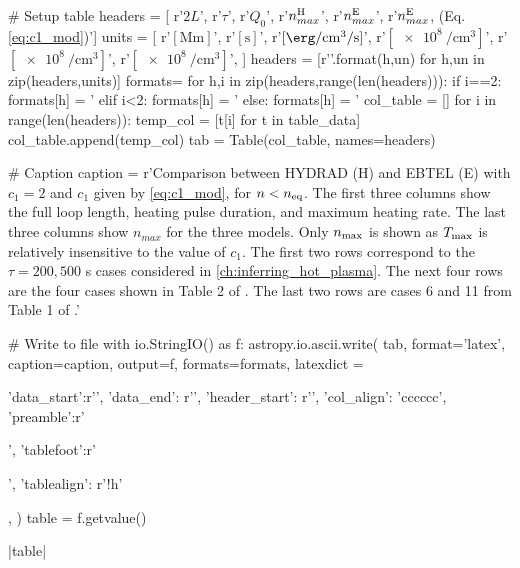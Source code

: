 \begin{pycode}[chapter2]
# Setup table
headers = [
    r'$2L$',
    r'$\tau$',
    r'$Q_0$',
    r'$n_{max}^\textup{H}$',
    r'$n_{max}^\textup{E}$',
    r'$n_{max}^\textup{E}$, (Eq. \ref{eq:c1_mod})']
units = [
    r'$[\si{\mega\m}]$',
    r'$[\si{\second}]$',
    r'$[\si{\erg\per\cubic\cm\per\second}]$',
    r'$[\SI{e8}{\per\cubic\cm}]$',
    r'$[\SI{e8}{\per\cubic\cm}]$',
    r'$[\SI{e8}{\per\cubic\cm}]$',
]
headers = [r'\thead{{{}\\{}}}'.format(h,un) for h,un in zip(headers,units)]
formats={}
for h,i in zip(headers,range(len(headers))):
    if i==2:
        formats[h] = '%
    elif i<2:
        formats[h] = '%
    else:
        formats[h] = '%
col_table = []
for i in range(len(headers)):
    temp_col = [t[i] for t in table_data]
    col_table.append(temp_col)
tab = Table(col_table, names=headers)

# Caption
caption = r'Comparison between HYDRAD (H) and EBTEL (E) with $c_1=2$ and $c_1$ given by \autoref{eq:c1_mod}, for $n<n_\textup{eq}$. The first three columns show the full loop length, heating pulse duration, and maximum heating rate. The last three columns show $n_{max}$ for the three models. Only $n_\textup{max}$ is shown as $T_\textup{max}$ is relatively insensitive to the value of $c_1$. The first two rows correspond to the $\tau=200,500$ s cases considered in \autoref{ch:inferring_hot_plasma}. The next four rows are the four cases shown in Table 2 of \citet{cargill_enthalpy-based_2012}. The last two rows are cases 6 and 11 from Table 1 of \citet{bradshaw_influence_2013}.\label{tab:table_c1_compare}'

# Write to file
with io.StringIO() as f:
    astropy.io.ascii.write(
        tab,
        format='latex',
        caption=caption,
        output=f,
        formats=formats,
        latexdict = {
            'data_start':r'\midrule', 'data_end': r'\bottomrule',
            'header_start': r'\toprule', 'col_align': 'cccccc',
            'preamble':r'\begin{center}', 'tablefoot':r'\end{center}',
            'tablealign': r'!h' },
    )
    table = f.getvalue()
\end{pycode}
\py[chapter2]|table|

